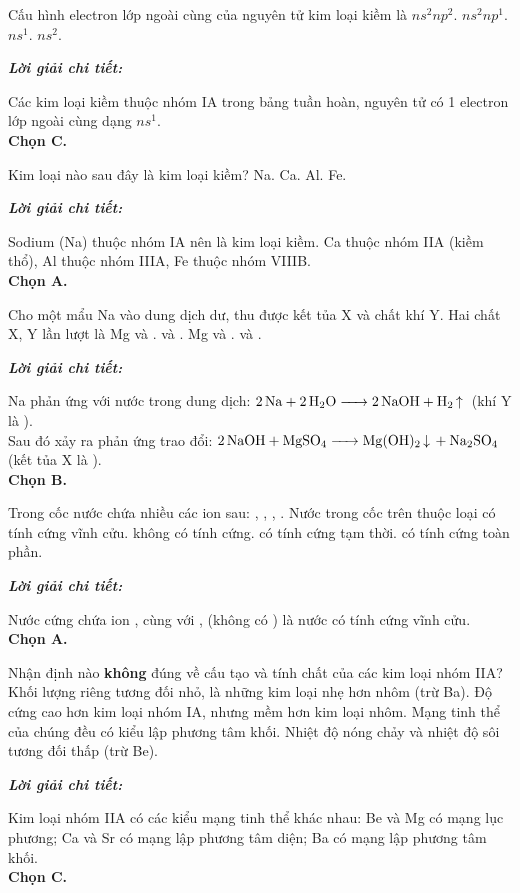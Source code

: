 \documentclass[11pt,a4paper]{article}
\def\loigiai#1{
\par\begingroup\color{blue!80!black}\small
\noindent\textbf{\textit{Lời giải chi tiết:}}\par
#1\par\endgroup}
\begin{document}
\begin{ex}
Cấu hình electron lớp ngoài cùng của nguyên tử kim loại kiềm là
\choice
{$ns^2np^2$.}
{$ns^2np^1$.}
{\True $ns^1$.}
{$ns^2$.}
\loigiai{
Các kim loại kiềm thuộc nhóm IA trong bảng tuần hoàn, nguyên tử có 1 electron lớp ngoài cùng dạng $ns^1$.\\
\textbf{Chọn C.}}
\end{ex}

\begin{ex}
Kim loại nào sau đây là kim loại kiềm?
\choice
{\True Na.}
{Ca.}
{Al.}
{Fe.}
\loigiai{
Sodium (Na) thuộc nhóm IA nên là kim loại kiềm. Ca thuộc nhóm IIA (kiềm thổ), Al thuộc nhóm IIIA, Fe thuộc nhóm VIIIB.\\
\textbf{Chọn A.}}
\end{ex}

\begin{ex}
Cho một mẩu Na vào dung dịch  dư, thu được kết tủa X và chất khí Y. Hai chất X, Y lần lượt là
\choice
{Mg và .}
{\True {} và .}
{Mg và .}
{ và .}
\loigiai{
Na phản ứng với nước trong dung dịch: $\ce{2Na + 2H2O -> 2NaOH + H2 ^}$ (khí Y là \ce{H2}).\\
Sau đó xảy ra phản ứng trao đổi: $\ce{2NaOH + MgSO4 -> Mg(OH)2 v + Na2SO4}$ (kết tủa X là \ce{Mg(OH)2}).\\
\textbf{Chọn B.}}
\end{ex}

\begin{ex}
Trong cốc nước chứa nhiều các ion sau: , , , . Nước trong cốc trên thuộc loại
\choice
{\True có tính cứng vĩnh cửu.}
{không có tính cứng.}
{có tính cứng tạm thời.}
{có tính cứng toàn phần.}
\loigiai{
Nước cứng chứa ion ,  cùng với \ce{Cl-}, \ce{SO4^2-} (không có \ce{HCO3-}) là nước có tính cứng vĩnh cửu.\\
\textbf{Chọn A.}}
\end{ex}

\begin{ex}
Nhận định nào \textbf{không} đúng về cấu tạo và tính chất của các kim loại nhóm IIA?
\choice
{Khối lượng riêng tương đối nhỏ, là những kim loại nhẹ hơn nhôm (trừ Ba).}
{Độ cứng cao hơn kim loại nhóm IA, nhưng mềm hơn kim loại nhôm.}
{\True Mạng tinh thể của chúng đều có kiểu lập phương tâm khối.}
{Nhiệt độ nóng chảy và nhiệt độ sôi tương đối thấp (trừ Be).}
\loigiai{
Kim loại nhóm IIA có các kiểu mạng tinh thể khác nhau: Be và Mg có mạng lục phương; Ca và Sr có mạng lập phương tâm diện; Ba có mạng lập phương tâm khối.\\
\textbf{Chọn C.}}
\end{ex}
\end{document}
